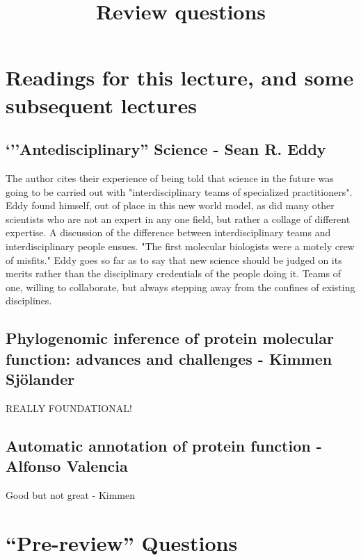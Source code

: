 \documentclass[11pt]{article}
\title{Review questions}
\author{\Name}%
\begin{document}
\maketitle

\section*{Readings for this lecture, and some subsequent lectures}

\subsection*{`''Antedisciplinary'' Science - Sean R. Eddy}
The author cites their experience of being told that science in the future
was going to be carried out with "interdisciplinary teams of specialized practitioners".
Eddy found himself, out of place in this new world model, as did many other 
scientists who are not an expert in any one field, but rather a collage of
different expertise. A discussion of the difference between interdisciplinary 
teams and interdisciplinary people ensues. "The first molecular biologists were
a motely crew of misfits." Eddy goes so far as to say that new science should
be judged on its merits rather than the disciplinary credentials of the people
doing it. Teams of one, willing to collaborate, but always stepping away from 
the confines of existing disciplines.

\subsection*{Phylogenomic inference of protein molecular function: advances and challenges - Kimmen Sjölander}

REALLY FOUNDATIONAL!

\subsection*{Automatic annotation of protein function - Alfonso Valencia}

Good but not great - Kimmen

\section*{``Pre-review'' Questions}
\end{document}
